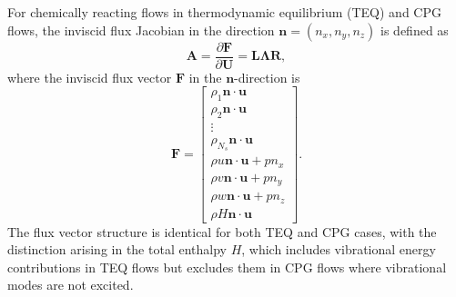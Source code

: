 For chemically reacting flows in thermodynamic equilibrium (\gls{TEQ}) and \gls{CPG} flows, the inviscid flux Jacobian in the direction $\mathbf{n} = (n_x, n_y, n_z)$ is defined as
\begin{equation}
\mathbf{A} = \frac{\partial \mathbf{F}}{\partial \mathbf{U}} = \mathbf{L}\mathbf{\Lambda}\mathbf{R},
\end{equation}
where the inviscid flux vector $\mathbf{F}$ in the $\mathbf{n}$-direction is
\begin{equation}
\mathbf{F} = \begin{bmatrix}
\rho_1 \mathbf{n} \cdot \mathbf{u} \\
\rho_2 \mathbf{n} \cdot \mathbf{u} \\
\vdots \\
\rho_{N_s} \mathbf{n} \cdot \mathbf{u} \\
\rho u \mathbf{n} \cdot \mathbf{u} + p n_x \\
\rho v \mathbf{n} \cdot \mathbf{u} + p n_y \\
\rho w \mathbf{n} \cdot \mathbf{u} + p n_z \\
\rho H \mathbf{n} \cdot \mathbf{u}
\end{bmatrix}.
\end{equation}
The flux vector structure is identical for both \gls{TEQ} and \gls{CPG} cases, with the distinction arising in the total enthalpy $H$, which includes vibrational energy contributions in \gls{TEQ} flows but excludes them in \gls{CPG} flows where vibrational modes are not excited. 

